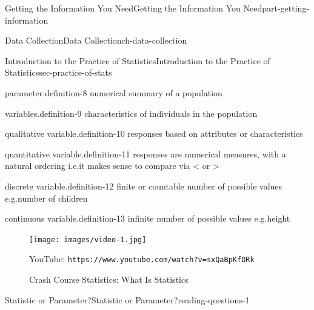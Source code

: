 \documentclass[oneside,10pt,]{book}
\newcommand{\mono}[1]{\texttt{#1}}
\numberwithin{equation}{section}
\newlength{\qrsize}
\newlength{\previewwidth}
\begin{document}
\begin{partptx}{Getting the Information You Need}{}{Getting the Information You Need}{}{}{part-getting-information}
\begin{chapterptx}{Data Collection}{}{Data Collection}{}{}{ch-data-collection}
\begin{sectionptx}{Introduction to the Practice of Statistics}{}{Introduction to the Practice of Statistics}{}{}{sec-practice-of-stats}
\begin{definition}{parameter.}{definition-8}
numerical summary of a population\end{definition}
\begin{definition}{variables.}{definition-9}%
characteristics of individuals in the population\end{definition}
\begin{definition}{qualitative variable.}{definition-10}%
responses based on attributes or characteristics\end{definition}
\begin{definition}{quantitative variable.}{definition-11}%
responses are numerical measures, with a natural ordering i.e.\@ it makes sense to compare via \textless{} or \textgreater{}\end{definition}
\begin{definition}{discrete variable.}{definition-12}%
finite or countable number of possible values e.g.\@ number of children\end{definition}
\begin{definition}{continuous variable.}{definition-13}%
infinite number of possible values e.g.\@ height\end{definition}
\begin{figure}
\centering
\setlength{\qrsize}{9em}
\setlength{\previewwidth}{\linewidth}
\addtolength{\previewwidth}{-\qrsize}
\begin{tcbraster}[raster columns=2, raster column skip=1pt, raster halign=center, raster force size=false, raster left skip=0pt, raster right skip=0pt]%
\begin{tcolorbox}[previewstyle, width=\previewwidth]%
\texttt{[image: images/video-1.jpg]}%
\end{tcolorbox}%
\begin{tcolorbox}[qrstyle]%
{\hypersetup{urlcolor=black}}%
\end{tcolorbox}%
\begin{tcolorbox}[captionstyle]%
\small YouTube: \mono{https://www.youtube.com/watch?v=sxQaBpKfDRk}\end{tcolorbox}%
\end{tcbraster}%
\caption{Crash Course Statistics: What Is Statistics\label{figure-1}}
\end{figure}
%
%
\typeout{************************************************}
\typeout{************************************************}
%
\begin{reading-questions-subsection-numberless}{Statistic or Parameter?}{}{Statistic or Parameter?}{}{}{reading-questions-1}

\end{reading-questions-subsection-numberless}
\end{sectionptx}
\end{chapterptx}
\end{partptx}
\end{document}
